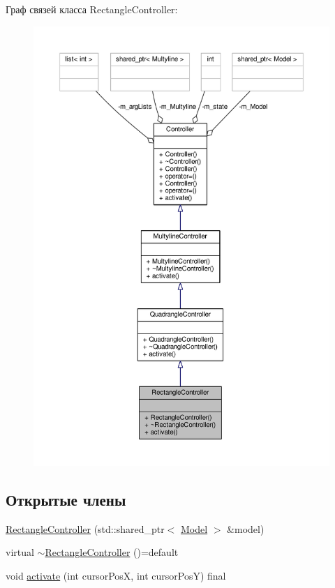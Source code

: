 Граф связей класса Rectangle\-Controller\-:
\nopagebreak
\begin{figure}[H]
\begin{center}
\leavevmode
\includegraphics[width=350pt]{class_rectangle_controller__coll__graph}
\end{center}
\end{figure}
\subsection*{Открытые члены}
\begin{DoxyCompactItemize}
\item 
\hyperlink{class_rectangle_controller_a31b4fd49338cbd4cdcadbf4cdc9bb1b7}{Rectangle\-Controller} (std\-::shared\-\_\-ptr$<$ \hyperlink{class_model}{Model} $>$ \&model)
\item 
virtual \hyperlink{class_rectangle_controller_a5bfdcba403d2189aeb7672ec66c9d3e2}{$\sim$\-Rectangle\-Controller} ()=default
\item 
void \hyperlink{class_rectangle_controller_ac0d209fecccce59cf9270f7f6facbc06}{activate} (int cursor\-Pos\-X, int cursor\-Pos\-Y) final
\end{DoxyCompactItemize}


